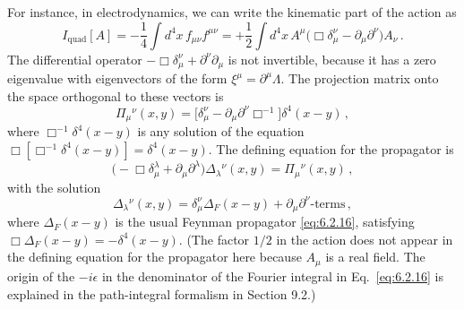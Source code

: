 For instance, in electrodynamics, we can write the kinematic part of the
action as
\[
  I_{\mathrm{quad}}[A]
  =-\frac14\int d^4x\,f_{\mu\nu}f^{\mu\nu}
  =+\frac12\int d^4x\,
    A^\mu\bigl(\Box\delta_\mu^\nu-\partial_\mu\partial^\nu\bigr)A_\nu\,.
\]
The differential operator
\(-\Box\delta_\mu^\nu+\partial^\nu\partial_\mu\) is not invertible, because
it has a zero eigenvalue with eigenvectors of the form
\(\xi^\mu=\partial^\mu\Lambda\). The projection matrix onto the space
orthogonal to these vectors is
\[
  \Pi_\mu{}^\nu(x,y)
  =\bigl[\delta_\mu^\nu-\partial_\mu\partial^\nu\Box^{-1}\bigr]
    \delta^4(x-y)\,,
\]
where \(\Box^{-1}\delta^4(x-y)\) is any solution of the equation
\(\Box[\Box^{-1}\delta^4(x-y)]=\delta^4(x-y)\). The defining equation for
the propagator is
\[
  \bigl(-\Box\delta_\mu^\lambda+\partial_\mu\partial^\lambda\bigr)
  \Delta_\lambda{}^\nu(x,y)
  =\Pi_\mu{}^\nu(x,y)\,,
\]
with the solution
\[
  \Delta_\lambda{}^\nu(x,y)
  =\delta_\mu^\nu\Delta_F(x-y)
   +\partial_\mu\partial^\nu\text{-terms}\,,
\]
where \(\Delta_F(x-y)\) is the usual Feynman propagator
\eqref{eq:6.2.16}, satisfying
\(\Box\Delta_F(x-y)=-\delta^4(x-y)\). (The factor \(1/2\) in the action
does not appear in the defining equation for the propagator here because
\(A_\mu\) is a real field. The origin of the \(-i\epsilon\) in the
denominator of the Fourier integral in Eq.~\eqref{eq:6.2.16} is explained
in the path-integral formalism in Section 9.2.)

